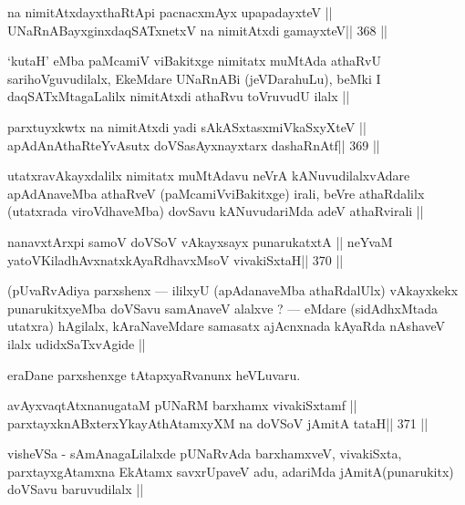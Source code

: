 \begin{shl}
na nimitAtxdayxthaRtA\s pi pacnacxmAyx upapadayxteV ||
UNaRnABayxginxdaqSATxnetxV na nimitAtxdi gamayxteV\hfill || 368 ||
\end{shl}

\begin{artha}
`kutaH' eMba paMcamiV viBakitxge nimitatx muMtAda athaRvU sarihoVguvudilalx, EkeMdare UNaRnABi (jeVDarahuLu), beMki I daqSATxMtagaLalilx nimitAtxdi athaRvu toVruvudU ilalx ||
\end{artha}

\begin{shl}
parxtuyxkwtx na nimitAtxdi yadi sAkASxtasxmiVkaSxyXteV ||
apAdAnAthaRteYvAsutx doVSasAyxnayxtarx dashaRnAtf\hfill || 369 ||
\end{shl}

\begin{artha}
utatxravAkayxdalilx nimitatx muMtAdavu neVrA kANuvudilalxvAdare apAdAnaveMba athaRveV (paMcamiVviBakitxge) irali, beVre athaRdalilx (utatxrada viroVdhaveMba) dovSavu kANuvudariMda adeV athaRvirali ||
\end{artha}

\begin{shl}
nanavxtArxpi samoV doVSoV vAkayxsayx punarukatxtA ||
neYvaM yatoV\s KiladhAvxnatxkAyaRdhavxMsoV vivakiSxtaH\hfill || 370 ||
\end{shl}

\begin{artha}
(pUvaRvAdiya parxshenx --- ililxyU (apAdanaveMba athaRdalUlx) vAkayxkekx punarukitxyeMba doVSavu samAnaveV alalxve ? --- eMdare (sidAdhxMtada utatxra) hAgilalx, kAraNaveMdare samasatx ajAcnxnada kAyaRda nAshaveV ilalx udidxSaTxvAgide || 
\end{artha}

\begin{artha}
eraDane parxshenxge tAtapxyaRvanunx heVLuvaru.
\end{artha}

\begin{shl}
avAyxvaqtAtxnanugataM pUNaRM barxhamx vivakiSxtamf ||
parxtayxknABxterxYkayAthAtamxyXM na doVSoV jAmitA tataH\hfill || 371 ||
\end{shl}

\begin{artha}
visheVSa - sAmAnagaLilalxde pUNaRvAda barxhamxveV, vivakiSxta, parxtayxgAtamxna EkAtamx savxrUpaveV adu, adariMda jAmitA(punarukitx) doVSavu baruvudilalx ||
\end{artha}

